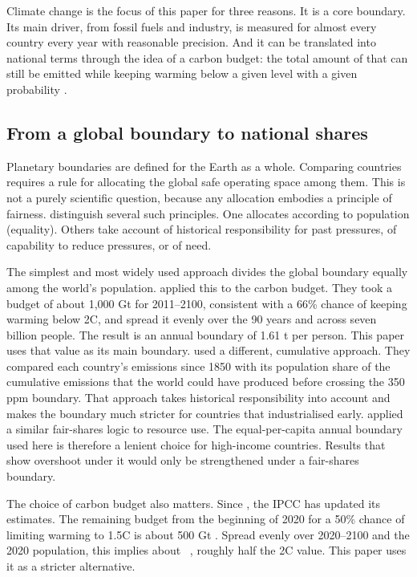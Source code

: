 Climate change is the focus of this paper for three reasons. It is a core boundary. Its main driver, \COtwo{} from fossil fuels and industry, is measured for almost every country every year with reasonable precision. And it can be translated into national terms through the idea of a carbon budget: the total amount of \COtwo{} that can still be emitted while keeping warming below a given level with a given probability \citep{ipcc2021spm}.

\subsection{From a global boundary to national shares}

Planetary boundaries are defined for the Earth as a whole. Comparing countries requires a rule for allocating the global safe operating space among them. This is not a purely scientific question, because any allocation embodies a principle of fairness. \citet{haeyhae2016} distinguish several such principles. One allocates according to population (equality). Others take account of historical responsibility for past pressures, of capability to reduce pressures, or of need.

The simplest and most widely used approach divides the global boundary equally among the world's population. \citet{oneill2018} applied this to the carbon budget. They took a budget of about 1{,}000 Gt \COtwo{} for 2011--2100, consistent with a 66\% chance of keeping warming below 2\textdegree C, and spread it evenly over the 90 years and across seven billion people. The result is an annual boundary of 1.61 t \COtwo{} per person. This paper uses that value as its main boundary. \citet{fanning2022} used a different, cumulative approach. They compared each country's emissions since 1850 with its population share of the cumulative emissions that the world could have produced before crossing the 350 ppm boundary. That approach takes historical responsibility into account and makes the boundary much stricter for countries that industrialised early. \citet{hickel2022} applied a similar fair-shares logic to resource use. The equal-per-capita annual boundary used here is therefore a lenient choice for high-income countries. Results that show overshoot under it would only be strengthened under a fair-shares boundary.

The choice of carbon budget also matters. Since \citet{oneill2018}, the IPCC has updated its estimates. The remaining budget from the beginning of 2020 for a 50\% chance of limiting warming to 1.5\textdegree C is about 500 Gt \COtwo{} \citep{ipcc2021spm}. Spread evenly over 2020--2100 and the 2020 population, this implies about \nBoundaryFifteen~\tpc, roughly half the 2\textdegree C value. This paper uses it as a stricter alternative.

